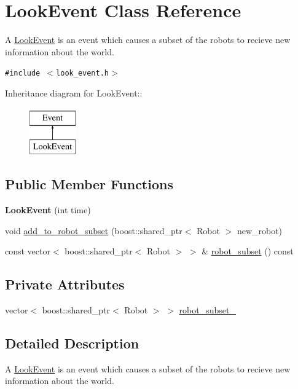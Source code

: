 \hypertarget{class_look_event}{
\section{LookEvent Class Reference}
\label{class_look_event}
}
A \hyperlink{class_look_event}{LookEvent} is an event which causes a subset of the robots to recieve new information about the world.  


{\tt \#include $<$look\_\-event.h$>$}

Inheritance diagram for LookEvent::\begin{figure}[H]
\begin{center}
\leavevmode
\includegraphics[height=2cm]{class_look_event}
\end{center}
\end{figure}
\subsection*{Public Member Functions}
\begin{CompactItemize}
\item 
\hypertarget{class_look_event_d1f3c66e1562c94f0e63564ec10ec599}{
\textbf{LookEvent} (int time)}
\label{class_look_event_d1f3c66e1562c94f0e63564ec10ec599}

\item 
void \hyperlink{class_look_event_69ea06b306f36339e6e5fbe3ffa7b1b8}{add\_\-to\_\-robot\_\-subset} (boost::shared\_\-ptr$<$ Robot $>$ new\_\-robot)
\item 
const vector$<$ boost::shared\_\-ptr$<$ Robot $>$ $>$ \& \hyperlink{class_look_event_3c33e32768298a315a0a242c823ea957}{robot\_\-subset} () const 
\end{CompactItemize}
\subsection*{Private Attributes}
\begin{CompactItemize}
\item 
vector$<$ boost::shared\_\-ptr$<$ Robot $>$ $>$ \hyperlink{class_look_event_a01e6d88edc4ae67bd1db1632eafb55f}{robot\_\-subset\_\-}
\end{CompactItemize}


\subsection{Detailed Description}
A \hyperlink{class_look_event}{LookEvent} is an event which causes a subset of the robots to recieve new information about the world. 

